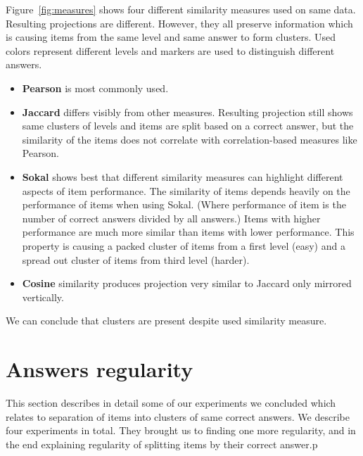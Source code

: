 \documentclass[
  printed, %
  table,   %
  nolof,     %
  nolot,     %
  color,
  final,
  nocover
]{fithesis3}
\begin{document}

Figure~\ref{fig:measures} shows four different similarity measures used on same data. Resulting projections are different. However, they all preserve information which is causing items from the same level and same answer to form clusters. Used colors represent different levels and markers are used to distinguish different answers.


\begin{itemize}
\item
  \textbf{Pearson} is most commonly used.

\item
  \textbf{Jaccard} differs visibly from other measures. Resulting projection still shows same clusters of levels and items are split based on a correct answer, but the similarity of the items does not correlate with correlation-based measures like Pearson.

\item
  \textbf{Sokal} shows best that different similarity measures can highlight different aspects of item performance. The similarity of items depends heavily on the performance of items when using Sokal. (Where performance of item is the number of correct answers divided by all answers.) Items with higher performance are much more similar than items with lower performance. This property is causing a packed cluster of items from a first level (easy) and a spread out cluster of items from third level (harder).

\item
  \textbf{Cosine} similarity produces projection very similar to Jaccard only mirrored vertically.
\end{itemize}

We can conclude that clusters are present despite used similarity measure.


\section{Answers regularity}\label{evaulation-answers-regularity}

This section describes in detail some of our experiments we concluded which relates to separation of items into clusters of same correct answers. We describe four experiments in total. They brought us to finding one more regularity, and in the end explaining regularity of splitting items by their correct answer.p
\end{document}
